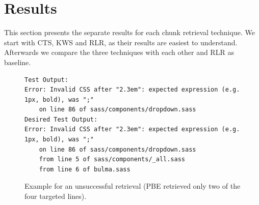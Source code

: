 \section{Results}
This section presents the separate results for each chunk retrieval
technique.
We start with CTS, KWS and RLR, as their results are easiest to
understand.
Afterwards we compare the three techniques with each other and RLR as
baseline.

\begin{figure}[!t]
  \centering
  \begin{lstlisting}[breaklines=true]
Test Output:
Error: Invalid CSS after "2.3em": expected expression (e.g.
1px, bold), was ";"
	on line 86 of sass/components/dropdown.sass
Desired Test Output:
Error: Invalid CSS after "2.3em": expected expression (e.g.
1px, bold), was ";"
	on line 86 of sass/components/dropdown.sass
	from line 5 of sass/components/_all.sass
	from line 6 of bulma.sass
  \end{lstlisting}
  \caption{Example for an unsuccessful retrieval (PBE retrieved only
  two of the four targeted lines).}
  \label{lst:pbe-unsuccessful}
\end{figure}

